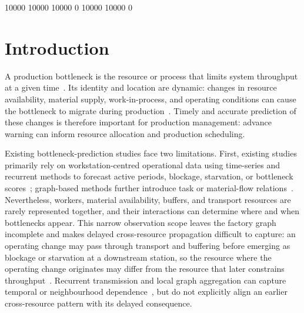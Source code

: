 \documentclass[a4paper,fleqn]{cas-dc}
\begin{document}
 10000 10000 10000 0
 10000 10000 0
\section{Introduction} \label{sec:intro}

A production bottleneck is the resource or process that limits system throughput at a given time~\cite{subramaniyan2023throughput,tang2024comprehensive}. Its identity and location are dynamic: changes in resource availability, material supply, work-in-process, and operating conditions can cause the bottleneck to migrate during production~\cite{lai2021data}. Timely and accurate prediction of these changes is therefore important for production management: advance warning can inform resource allocation and production scheduling.

Existing bottleneck-prediction studies face two limitations. First, existing studies primarily rely on workstation-centred operational data using time-series and recurrent methods to forecast active periods, blockage, starvation, or bottleneck scores~\cite{li2011throughput,subramaniyan2018data,lai2018twolayer,liu2023lstmdam}; graph-based methods further introduce task or material-flow relations~\cite{lai2023bstan,yin2025btgcn,ma2023tusb,cen2025dstnn,wu2025knowledge}. Nevertheless, workers, material availability, buffers, and transport resources are rarely represented together, and their interactions can determine where and when bottlenecks appear. This narrow observation scope leaves the factory graph incomplete and makes delayed cross-resource propagation difficult to capture: an operating change may pass through transport and buffering before emerging as blockage or starvation at a downstream station, so the resource where the operating change originates may differ from the resource that later constrains throughput~\cite{gu2015passive,zhang2022vulnerability}. Recurrent transmission and local graph aggregation can capture temporal or neighbourhood dependence~\cite{liu2023lstmdam,yin2025btgcn}, but do not explicitly align an earlier cross-resource pattern with its delayed consequence.
\end{document}
